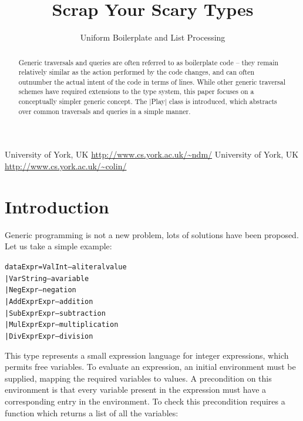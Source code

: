 \documentclass[preprint]{sigplanconf}
\newenvironment{code}{\begin{alltt}\small}{\end{alltt}}
\begin{document}
\copyrightdata{[to be supplied]}

\titlebanner{\today{} - \currenttime{}}        %
\preprintfooter{}   %

\title{Scrap Your Scary Types}
\subtitle{Uniform Boilerplate and List Processing}

           {University of York, UK}
           {\url{http://www.cs.york.ac.uk/~ndm/}}
           {University of York, UK}
           {\url{http://www.cs.york.ac.uk/~colin/}}

\maketitle

\begin{abstract}
Generic traversals and queries are often referred to as boilerplate code -- they remain relatively similar as the action performed by the code changes, and can often outnumber the actual intent of the code in terms of lines. While other generic traversal schemes have required extensions to the type system, this paper focuses on a conceptually simpler generic concept. The |Play| class is introduced, which abstracts over common traversals and queries in a simple manner.
\end{abstract}

\section{Introduction}

Generic programming is not a new problem, lots of solutions have been proposed. Let us take a simple example:

\begin{code}
data Expr  =  Val  Int         -- a literal value
           |  Var  String      -- a variable
           |  Neg  Expr        -- negation
           |  Add  Expr  Expr  -- addition
           |  Sub  Expr  Expr  -- subtraction
           |  Mul  Expr  Expr  -- multiplication
           |  Div  Expr  Expr  -- division
\end{code}

This type represents a small expression language for integer expressions, which permits free variables. To evaluate an expression, an initial environment must be supplied, mapping the required variables to values. A precondition on this environment is that every variable present in the expression must have a corresponding entry in the environment. To check this precondition requires a function which returns a list of all the variables:
\end{document}
